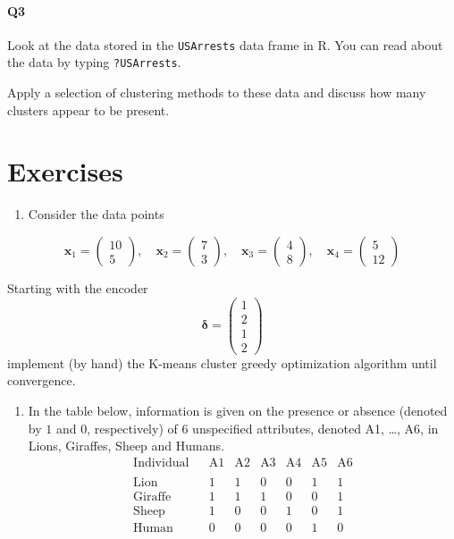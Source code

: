\documentclass[
]{book}
\providecommand{\tightlist}{%
  \setlength{\itemsep}{0pt}\setlength{\parskip}{0pt}}
\theoremstyle{definition}
\theoremstyle{definition}
\theoremstyle{definition}
\theoremstyle{definition}
\theoremstyle{remark}
\begin{document}
\hypertarget{q3}{%
\paragraph*{Q3}\label{q3}}

Look at the data stored in the \texttt{USArrests} data frame in R. You can read about the data by typing \texttt{?USArrests}.

Apply a selection of clustering methods to these data and discuss how many clusters appear to be present.

\hypertarget{exercises-6}{%
\section{Exercises}\label{exercises-6}}

\begin{enumerate}
\def\labelenumi{\arabic{enumi}.}
\tightlist
\item
  Consider the data points
\end{enumerate}

\[\mathbf x_1 =\begin{pmatrix}10\\5\end{pmatrix}, \quad 
\mathbf x_2 =\begin{pmatrix}7\\3\end{pmatrix}, \quad \mathbf x_3 =\begin{pmatrix}4\\8\end{pmatrix}, \quad
\mathbf x_4 =\begin{pmatrix}5\\12\end{pmatrix}\]

Starting with the encoder
\[\boldsymbol \delta= \begin{pmatrix} 1\\2\\1\\2\end{pmatrix}\]
implement (by hand) the K-means cluster greedy optimization algorithm until convergence.

\begin{enumerate}
\def\labelenumi{\arabic{enumi}.}
\setcounter{enumi}{1}
\tightlist
\item
  In the table below, information is given on the presence or absence (denoted by \(1\) and \(0\), respectively) of \(6\) unspecified attributes, denoted A1, \ldots, A6, in Lions, Giraffes, Sheep and Humans.
  \[
  \begin{array}{cccccccc}
  \textrm{Individual}  &&\textrm{A1}&\textrm{A2}&\textrm{A3}&\textrm{A4}&\textrm{A5}&\textrm{A6}\\
  &&&&&&\\
  \textrm{Lion}&&1&1&0&0&1&1\\
  \textrm{Giraffe}&&1&1&1&0&0&1\\
  \textrm{Sheep}&&1&0&0&1&0&1\\
  \textrm{Human}&&0&0&0&0&1&0
  \end{array}
  \]
\end{enumerate}
\end{document}

